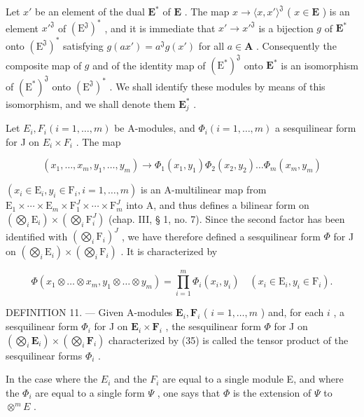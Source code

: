 Let \(x'\) be an element of the dual \(\mathbf{E}^*\) of \(\mathbf{E}\) . The map \(x \to \langle x, x' \rangle^{\mathfrak{J}}\) ( \(x \in \mathbf{E}\) ) is an element \(x'^{\mathfrak{J}}\) of \((\mathrm{E}^{\mathfrak{J}})^*\) , and it is immediate that \(x' \to x'^{\mathfrak{J}}\) is a bijection \(g\) of \(\mathbf{E}^*\) onto \((\mathrm{E}^{\mathfrak{J}})^*\) satisfying \(g(ax') = a^{\mathfrak{J}}g(x')\) for all \(a \in \mathbf{A}\) . Consequently the composite map of \(g\) and of the identity map of \((\mathrm{E}^*)^{\mathfrak{J}}\) onto \(\mathbf{E}^*\) is an isomorphism of \((\mathrm{E}^*)^{\mathfrak{J}}\) onto \((\mathrm{E}^{\mathfrak{J}})^*\) . We shall identify these modules by means of this isomorphism, and we shall denote them \(\mathbf{E}_j^*\) .

Let \(E_{i}, F_{i} (i = 1, \ldots, m)\) be A-modules, and \(\Phi_{i} (i = 1, \ldots, m)\) a sesquilinear form for J on \(E_{i} \times F_{i}\) . The map

\[
(x _ {1}, \dots , x _ {m}, y _ {1}, \dots , y _ {m}) \rightarrow \Phi_ {1} (x _ {1}, y _ {1}) \Phi_ {2} (x _ {2}, y _ {2}) \dots \Phi_ {m} (x _ {m}, y _ {m})
\]

\((x_{i} \in \mathrm{E}_{i}, y_{i} \in \mathrm{F}_{i}, i = 1, \ldots, m)\) is an A-multilinear map from \(\mathrm{E}_{1} \times \cdots \times \mathrm{E}_{m} \times \mathrm{F}_{1}^{J} \times \cdots \times \mathrm{F}_{m}^{J}\) into A, and thus defines a bilinear form on \((\bigotimes_{i} \mathrm{E}_{i}) \times (\bigotimes_{i} \mathrm{F}_{i}^{J})\) (chap. III, § 1, no. 7). Since the second factor has been identified with \((\bigotimes_{i} \mathrm{F}_{i})^{J}\) , we have therefore defined a sesquilinear form \(\Phi\) for J on \((\bigotimes_{i} \mathrm{E}_{i}) \times (\bigotimes_{i} \mathrm{F}_{i})\) . It is characterized by

\[
\Phi (x _ {1} \otimes \dots \otimes x _ {m}, y _ {1} \otimes \dots \otimes y _ {m}) = \prod_ {i = 1} ^ {m} \Phi_ {i} (x _ {i}, y _ {i}) \quad (x _ {i} \in \mathrm{E} _ {i}, y _ {i} \in \mathrm{F} _ {i}).\tag{35}
\]

DEFINITION 11. --- Given A-modules \(\mathbf{E}_{i}, \mathbf{F}_{i}\) ( \(i=1,\ldots,m\) ) and, for each \(i\) , a sesquilinear form \(\Phi_{i}\) for J on \(\mathbf{E}_{i} \times \mathbf{F}_{i}\) , the sesquilinear form \(\Phi\) for J on \((\bigotimes_{i}\mathbf{E}_{i}) \times (\bigotimes_{i}\mathbf{F}_{i})\) characterized by (35) is called the tensor product of the sesquilinear forms \(\Phi_{i}\) .

In the case where the \(E_{i}\) and the \(F_{i}\) are equal to a single module E, and where the \(\Phi_{i}\) are equal to a single form \(\Psi\) , one says that \(\Phi\) is the extension of \(\Psi\) to \(\otimes^{m}E\) .

